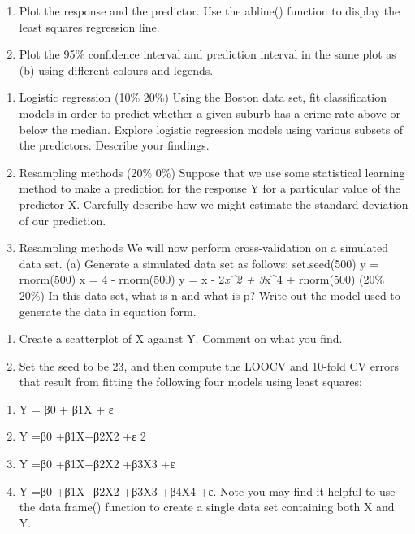\documentclass[]{article}
\providecommand{\tightlist}{%
  \setlength{\itemsep}{0pt}\setlength{\parskip}{0pt}}
\begin{document}
\begin{enumerate}
\def\labelenumi{(\alph{enumi})}
\setcounter{enumi}{1}
\tightlist
\item
  Plot the response and the predictor. Use the abline() function to
  display the least squares regression line.
\item
  Plot the 95\% confidence interval and prediction interval in the same
  plot as (b) using different colours and legends.
\end{enumerate}

\begin{enumerate}
\def\labelenumi{\arabic{enumi}.}
\setcounter{enumi}{4}
\tightlist
\item
  Logistic regression (10\% \textbar{} 20\%) Using the Boston data set,
  fit classification models in order to predict whether a given suburb
  has a crime rate above or below the median. Explore logistic
  regression models using various subsets of the predictors. Describe
  your findings.
\item
  Resampling methods (20\% \textbar{} 0\%) Suppose that we use some
  statistical learning method to make a prediction for the response Y
  for a particular value of the predictor X. Carefully describe how we
  might estimate the standard deviation of our prediction.
\item
  Resampling methods We will now perform cross-validation on a simulated
  data set. (a) Generate a simulated data set as follows: set.seed(500)
  y = rnorm(500) x = 4 - rnorm(500) y = x - 2\emph{x\^{}2 + 3}x\^{}4 +
  rnorm(500) (20\% \textbar{} 20\%) In this data set, what is n and what
  is p? Write out the model used to generate the data in equation form.
\end{enumerate}

\begin{enumerate}
\def\labelenumi{(\alph{enumi})}
\setcounter{enumi}{1}
\tightlist
\item
  Create a scatterplot of X against Y. Comment on what you find.
\item
  Set the seed to be 23, and then compute the LOOCV and 10-fold CV
  errors that result from fitting the following four models using least
  squares:
\end{enumerate}

\begin{enumerate}
\def\labelenumi{\roman{enumi}.}
\item
  Y = β0 + β1X + ε
\item
  Y =β0 +β1X+β2X2 +ε 2
\item
  Y =β0 +β1X+β2X2 +β3X3 +ε
\item
  Y =β0 +β1X+β2X2 +β3X3 +β4X4 +ε. Note you may find it helpful to use
  the data.frame() function to create a single data set containing both
  X and Y.
\end{enumerate}
\end{document}
